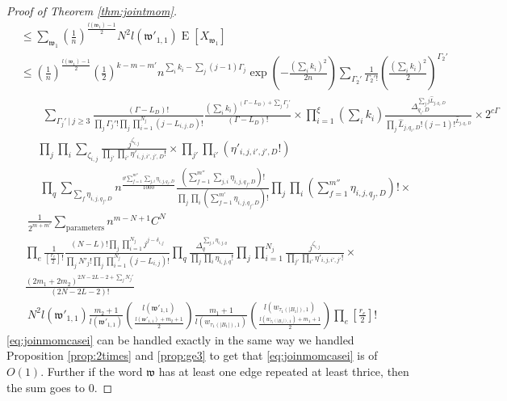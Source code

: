 \documentclass[12pt]{article}
\numberwithin{equation}{section}
\numberwithin{equation}{section}
\theoremstyle{definition}
\DeclareMathOperator{\E}{E} \DeclareMathOperator{\var}{Var}
\renewcommand{\1}{\bf 1}
\begin{document}
\begin{proof}[Proof of Theorem \ref{thm:jointmom}]
\begin{equation}
\begin{split}
& \le \sum_{\mathfrak{w}_{1}} \left( \frac{1}{n} \right)^{\frac{l(\mathfrak{w}_{1})-1}{2}}  N^{2}  l(\mathfrak{w}'_{1,1}) \E[X_{\mathfrak{w}_{1}}] \\
& \le \left( \frac{1}{n} \right)^{\frac{l(\mathfrak{w}_{1})-1}{2}}\left( \frac{1}{2} \right)^{k-m-m'}n^{\sum_{i}k_{i}- \sum_{j}(j-1)\Gamma_{j}}\exp\left( - \frac{\left( \sum_{i} k_{i} \right)^2}{2n} \right)\sum_{\Gamma_{2}'}\frac{1}{\Gamma_{2}'!}\left( \frac{\left( \sum_{i} k_{i} \right)^2}{2} \right)^{\Gamma_{2}'}\\
& ~~~~~~~~~ \sum_{\Gamma_{j}'~|~ j \ge 3}  \frac{\left(\Gamma-L_{D}\right)!}{\prod_{j}\Gamma_{j}'! \prod_{j}\prod_{i=1}^{N_{j}} (j- L_{i,j,D})!}\frac{\left( \sum_{i} k_{i} \right)^{(\Gamma - L_{D})+ \sum_{j}\Gamma_{j}'}}{\left(\Gamma- L_{D}\right)!}\times \prod_{i=1}^{\xi}\left( \sum_{
i}k_{i} \right)\frac{\Delta_{q_{i},D}^{\sum_{j}j\hat{L}_{j,q_{i},D}}}{\prod_{j}\hat{L}_{j,q_{i},D}!(j-1)!^{\hat{L}_{j,q_{i},D}} }\times  2^{c\Gamma}\\
& ~~~~~~~ \prod_{j}\prod_{i}\sum_{\zeta_{i,j}} \frac{j^{\zeta_{i,j}}}{\prod_{j'}\prod_{i'} \eta'_{i,j,i',j',D}!} \times \prod_{j'}\prod_{i'} \left( \eta'_{i,j,i',j',D}! \right)\\
& ~~~~~~~~ \prod_{q}\sum_{\sum_{f}\eta_{i,j,q_{f},D}} n^{\frac{\vartheta \sum_{f=1}^{m''}\sum_{j,i}\eta_{i,j,q_{f},D}}{1000}} \frac{\left( \sum_{f=1}^{m''} \sum_{j,i} \eta_{i,j,q_{f},D}\right)!}{\prod_{j}\prod_{i} \left( \sum_{f=1}^{m'} \eta_{i,j,q_{f},D} \right)!} \prod_{j}\prod_{i}\left( \sum_{f=1}^{m''} \eta_{i,j,q_{f},D} \right)! \times \\
& ~~~ \frac{1}{2^{m+m'}}\sum_{\text{parameters}}n^{m- N +1}C^{N}\\
&~~\prod_{e} \frac{1}{\left[\frac{r_{e}}{2}\right]!} \frac{(N-L)!\prod_{j}\prod_{i=1}^{N_{j}}j^{j-\delta_{i,j}}}{\prod_{j}N'_{j}! \prod_{j}\prod_{i=1}^{N_{j}}(j-L_{i,j})!}\prod_{q} \frac{\Delta_{q}^{\sum_{j,i}\eta_{i,j,q} }}{\prod_{j}\prod_{i}\eta_{i,j,q}!}\prod_{j}\prod_{i=1}^{N_{j}} \frac{j^{\zeta_{i,j}}}{\prod_{j'}\prod_{i'} \eta'_{i,j,i',j'}!} \times \\
&~~ \frac{(2m_{1}+2m_{2})^{2N-2L-2+ \sum_{j}N_{j}'}}{(2N-2L-2)!}\\
& ~~~N^{2}l(\mathfrak{w}'_{1,1})\frac{m_{2}+1}{l(\mathfrak{w}'_{1,1})}\binom{l(\mathfrak{w}'_{1,1})}{\frac{l(\mathfrak{w}'_{1,1})+m_{2}+1}{2}}\frac{m_{1}+1}{l(w_{\tau_{1}(|B_{1}|),1})}\binom{l(w_{\tau_{1}(|B_{1}|),1})}{\frac{l(w_{\tau_{1}(|B_{1}|),1})+m_{1}+1}{2}} \prod_{e} \left[ \frac{r_{e}}{2} \right]!
\end{split}
\end{equation}
\eqref{eq:joinmomcasei} can be handled exactly in the same way we handled Proposition \ref{prop:2times} and \ref{prop:ge3} to get that \eqref{eq:joinmomcasei} is of $O(1)$. Further if the word $\mathfrak{w}$ has at least one edge repeated at least thrice, then the sum goes to $0$. 


\end{proof}
\end{document}

